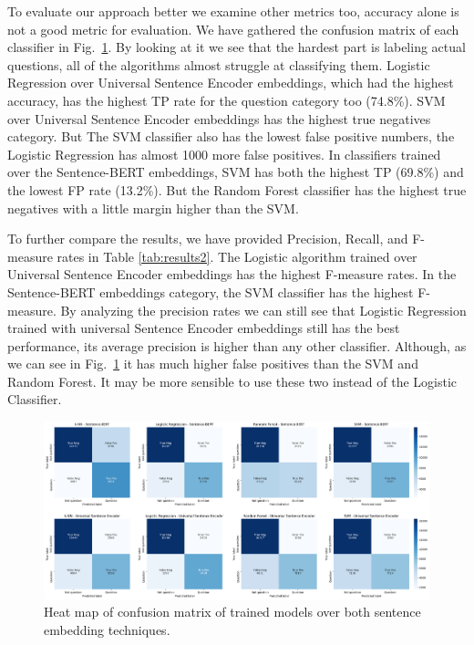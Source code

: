 \documentclass[conference]{IEEEtran}
\begin{document}
To evaluate our approach better we examine other metrics too, accuracy alone is not a good metric for 
evaluation. We have gathered the confusion matrix of each classifier in Fig.~\ref{fig:cfheatmap}. 
By looking at it we see that the hardest part is labeling actual questions, all of the algorithms almost 
struggle at classifying them. Logistic Regression over Universal Sentence Encoder embeddings, which had 
the highest accuracy, has the highest TP rate for the question category too (74.8\%). SVM over 
Universal Sentence Encoder embeddings has the highest true negatives category. 
But The SVM classifier also has the lowest false positive numbers, the Logistic Regression has almost 1000 more 
false positives. In classifiers trained over the Sentence-BERT embeddings, SVM has both the highest TP (69.8\%) 
and the lowest FP rate (13.2\%). But the Random Forest classifier has the highest true negatives with a 
little margin higher than the SVM.

To further compare the results, we have provided Precision, Recall, and F-measure rates in Table \ref{tab:results2}.
The Logistic algorithm trained over Universal Sentence Encoder embeddings has the highest F-measure rates.
In the Sentence-BERT embeddings category, the SVM classifier has the highest F-measure. By analyzing the precision 
rates we can still see that Logistic Regression trained with universal Sentence Encoder embeddings still has 
the best performance, its average precision is higher than any other classifier. 
Although, as we can see in Fig.~\ref{fig:cfheatmap} it has much higher false positives than the SVM and 
Random Forest. It may be more sensible to use these two instead of the Logistic Classifier.

\begin{figure}[t]
  \centerline{\includegraphics[width=7.16in]{./figures/cf-heatmaps8.png}}
  \caption{Heat map of confusion matrix of trained models over both sentence embedding techniques.}
  \label{fig:cfheatmap}
\end{figure}
\end{document}
